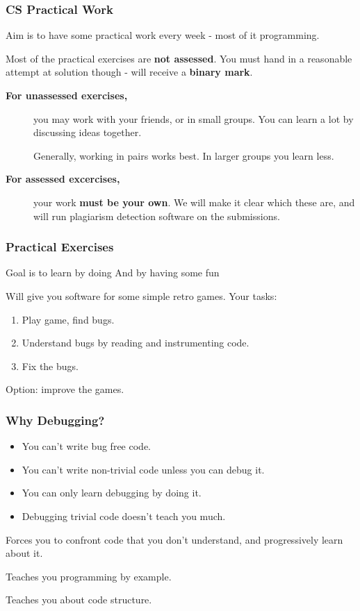 \documentclass{beamer} %
\newcommand\emc[1]{\textcolor{midred}{\textbf{#1}}}
\begin{document}
\begin{frame}
  \frametitle{CS Practical Work}

  Aim is to have some practical work every week - most of it programming.

\vspace{3mm}
  Most of the practical exercises are \emc{not assessed}.  You must hand in
  a reasonable attempt at solution though - will receive a \emc{binary
  mark}.

 \begin{description}
  \item[{\bf For unassessed exercises,}] you may work with your friends, or in
  small groups.  You can learn a lot by discussing ideas together.

  \vspace{3mm}
Generally, working in pairs works best.  In larger groups you learn
  less.

  \item[{\bf For assessed excercises,}] your work \emc{\bf must be your own}.  We will make
  it clear which these are, and will run plagiarism detection software
  on the submissions.
  \end{description}
\end{frame}

\begin{frame}
  \frametitle{Practical Exercises}

  Goal is to learn by doing
  And by having some fun

  Will give you software for some simple retro games.
  Your tasks:
  \begin{enumerate}
  \item Play game, find bugs.
  \item Understand bugs by reading and instrumenting code.
  \item Fix the bugs.
  \end{enumerate}
  Option: improve the games.
\end{frame}

\begin{frame}
  \frametitle{Why Debugging?}

  \begin{itemize}
  \item You can't write bug free code.
  \item You can't write non-trivial code unless you can debug it.
  \item You can only learn debugging by doing it.
  \item Debugging trivial code doesn't teach you much.
  \end{itemize}

  Forces you to confront code that you don't understand, and
  progressively learn about it.
  \vspace{2mm}
  \begin{description}
  \item Teaches you programming by example.
  \item Teaches you about code structure.
  \end{description}
\end{frame}
\end{document}
